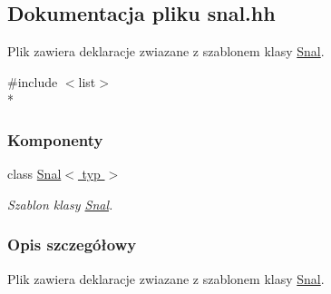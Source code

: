 \hypertarget{snal_8hh}{\subsection{Dokumentacja pliku snal.\-hh}
\label{snal_8hh}
}


Plik zawiera deklaracje zwiazane z szablonem klasy \hyperlink{class_snal}{Snal}.  


{\ttfamily \#include $<$list$>$}\\*
\subsubsection*{Komponenty}
\begin{DoxyCompactItemize}
\item 
class \hyperlink{class_snal}{Snal$<$ typ $>$}
\begin{DoxyCompactList}\small\item\em Szablon klasy \hyperlink{class_snal}{Snal}. \end{DoxyCompactList}\end{DoxyCompactItemize}


\subsubsection{Opis szczegółowy}
Plik zawiera deklaracje zwiazane z szablonem klasy \hyperlink{class_snal}{Snal}. 